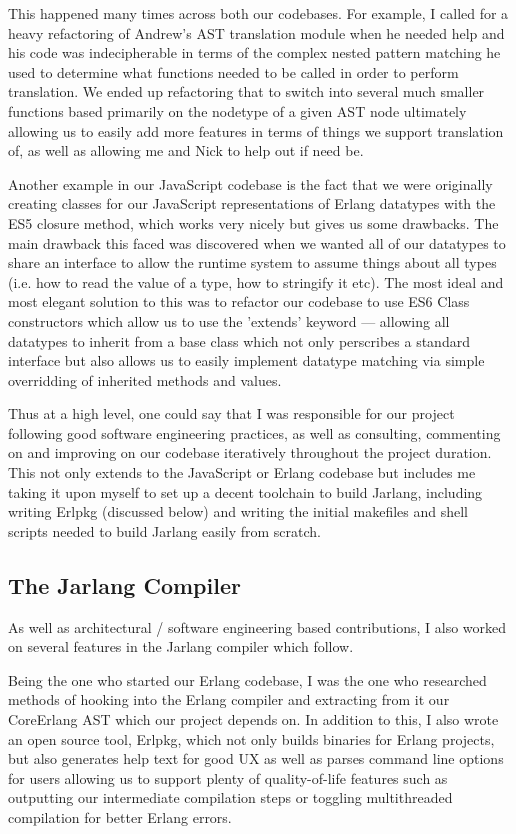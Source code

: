 \documentclass[twoside,12pt,titlepage,a4paper]{article}
\begin{document}
		This happened many times across both our codebases. For example, I called for a heavy refactoring of Andrew's AST translation
		module when he needed help and his code was indecipherable in terms of the complex nested pattern matching he used to determine
		what functions needed to be called in order to perform translation. We ended up refactoring that to switch into several much
		smaller functions based primarily on the nodetype of a given AST node ultimately allowing us to easily add more features in terms
		of things we support translation of, as well as allowing me and Nick to help out if need be.

		Another example in our JavaScript codebase is the fact that we were originally creating classes for our JavaScript
		representations of Erlang datatypes with the ES5 closure method, which works very nicely but gives us some drawbacks.
		The main drawback this faced was discovered when we wanted all of our datatypes to share an interface to allow the runtime system
		to assume things about all types (i.e. how to read the value of a type, how to stringify it etc). 
		The most ideal and most elegant solution to this was to refactor our codebase to use ES6 Class constructors which allow us to use the 
		'extends' keyword --- allowing all datatypes to inherit from a base class which not only perscribes a standard interface but also
		allows us to easily implement datatype matching via simple overridding of inherited methods and values.

		Thus at a high level, one could say that I was responsible for our project following good software engineering practices,
		as well as consulting, commenting on and improving on our codebase iteratively throughout the project duration. This not
		only extends to the JavaScript or Erlang codebase but includes me taking it upon myself to set up a decent toolchain to 
		build Jarlang, including writing Erlpkg (discussed below) and writing the initial makefiles and shell scripts needed
		to build Jarlang easily from scratch.

	\subsection{The Jarlang Compiler}
		As well as architectural / software engineering based contributions, I also worked on several features in the Jarlang
		compiler which follow.

		Being the one who started our Erlang codebase, I was the one who researched methods of hooking into the Erlang compiler
		and extracting from it our CoreErlang AST which our project depends on. In addition to this, I also wrote an open source
		tool, Erlpkg, which not only builds binaries for Erlang projects, but also generates help text for good UX as well as
		parses command line options for users allowing us to support plenty of quality-of-life features such as outputting
		our intermediate compilation steps or toggling multithreaded compilation for better Erlang errors.
\end{document}

